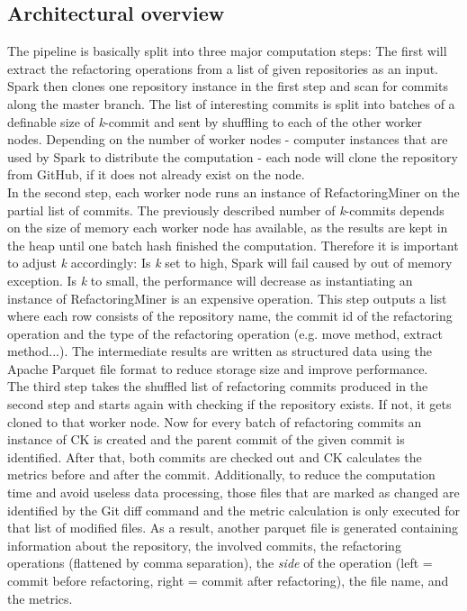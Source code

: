 \documentclass[conference]{IEEEtran}
\begin{document}
\subsection{Architectural overview}
The pipeline is basically split into three major computation steps: The first will extract the refactoring operations from a list of given repositories as an input. Spark then clones one repository instance in the first step and scan for commits along the master branch. The list of interesting commits is split into batches of a definable size of \emph{k}-commit and sent by shuffling to each of the other worker nodes. Depending on the number of worker nodes - computer instances that are used by Spark to distribute the computation - each node will clone the repository from GitHub, if it does not already exist on the node.\\
In the second step, each worker node runs an instance of RefactoringMiner on the partial list of commits. The previously described number of \emph{k}-commits depends on the size of memory each worker node has available, as the results are kept in the heap until one batch hash finished the computation. Therefore it is important to adjust \emph{k} accordingly: Is \emph{k} set to high, Spark will fail caused by out of memory exception. Is \emph{k} to small, the performance will decrease as instantiating an instance of RefactoringMiner is an expensive operation. This step outputs a list where each row consists of the repository name, the commit id of the refactoring operation and the type of the refactoring operation (e.g. move method, extract method...). The intermediate results are written as structured data using the Apache Parquet file format \cite{parquet} to reduce storage size and improve performance.\\
The third step takes the shuffled list of refactoring commits produced in the second step and starts again with checking if the repository exists. If not, it gets cloned to that worker node. Now for every batch of refactoring commits an instance of CK is created and the parent commit of the given commit is identified. After that, both commits are checked out and CK calculates the metrics before and after the commit. Additionally, to reduce the computation time and avoid useless data processing, those files that are marked as changed are identified by the Git diff command and the metric calculation is only executed for that list of modified files. As a result, another parquet file is generated containing information about the repository, the involved commits, the refactoring operations (flattened by comma separation), the \emph{side} of the operation (left = commit before refactoring, right = commit after refactoring), the file name, and the metrics.
\end{document}

